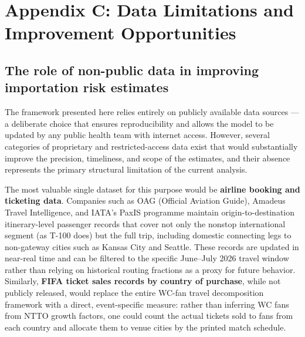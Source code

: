 \documentclass[12pt]{article}
\begin{document}
\section*{Appendix C: Data Limitations and Improvement Opportunities}

\subsection*{The role of non-public data in improving importation risk estimates}

The framework presented here relies entirely on publicly available
data sources --- a deliberate choice that ensures reproducibility and
allows the model to be updated by any public health team with internet
access. However, several categories of proprietary and restricted-access
data exist that would substantially improve the precision, timeliness,
and scope of the estimates, and their absence represents the primary
structural limitation of the current analysis.

The most valuable single dataset for this purpose would be
\textbf{airline booking and ticketing data}. Companies such as OAG
(Official Aviation Guide), Amadeus Travel Intelligence, and IATA's
PaxIS programme maintain origin-to-destination itinerary-level passenger
records that cover not only the nonstop international segment (as T-100
does) but the full trip, including domestic connecting legs to non-gateway
cities such as Kansas City and Seattle. These records are updated in
near-real time and can be filtered to the specific June--July 2026 travel
window rather than relying on historical routing fractions as a proxy for
future behavior. Similarly, \textbf{FIFA ticket sales records by country
of purchase}, while not publicly released, would replace the entire
WC-fan travel decomposition framework with a direct, event-specific
measure: rather than inferring WC fans from NTTO growth factors,
one could count the actual tickets sold to fans from each country and
allocate them to venue cities by the printed match schedule.
\end{document}
